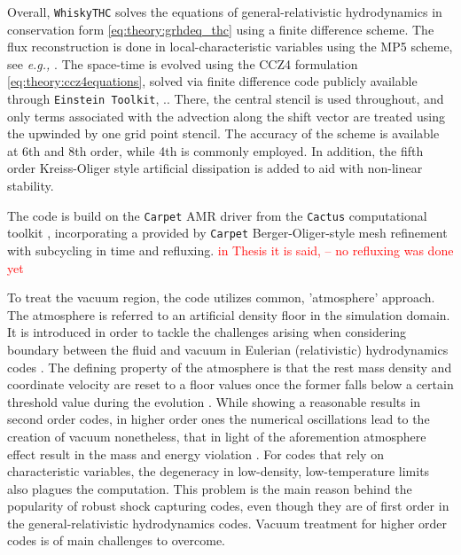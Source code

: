 Overall, \texttt{WhiskyTHC} solves the equations of general-relativistic hydrodynamics in conservation form \ref{eq:theory:grhdeq_thc} using a finite difference scheme. 
The flux reconstruction is done in local-characteristic variables using the MP5 scheme, see \textit{e.g.,} \cite{Rezzolla:2013} .
The space-time is evolved using the CCZ4 formulation \ref{eq:theory:ccz4equations}, solved via finite difference code publicly available through \texttt{Einstein Toolkit}, \cite{McLachlan,Loffler:2011ay}..
There, the central stencil is used throughout, and only terms associated with the advection along the shift vector are treated using the upwinded by one grid point stencil. The accuracy of the scheme is available at 6th and 8th order, while 4th is commonly employed. In addition, the fifth order Kreiss-Oliger style artificial dissipation \cite{Kreiss:1973} is added to aid with non-linear stability.

The code is build on the \texttt{Carpet} AMR driver \cite{Schnetter:2003rb} from the \texttt{Cactus} computational toolkit \cite{Goodale:2003}, incorporating a provided by \texttt{Carpet} Berger-Oliger-style mesh refinement \cite{Berger:1989,Berger:1984} with subcycling in time and refluxing. \textcolor{red}{in Thesis it is said, -- no refluxing was done yet}

To treat the vacuum region, the code utilizes common, 'atmosphere' approach. The atmosphere is referred to an artificial density floor in the simulation domain. It is introduced in order to tackle the challenges arising when considering boundary between the fluid and vacuum in Eulerian (relativistic) hydrodynamics codes \cite{Galeazzi:mThesis:2008,Kastaun:2006,Millmore:2009dk}. 
The defining property of the atmosphere is that the rest mass density and coordinate velocity are reset to a floor values once the former falls below a certain threshold value during the evolution \cite{Font:2001ew,Baiotti:2004wn}. While showing a reasonable results in second order codes, in higher order ones the numerical oscillations lead to the creation of vacuum nonetheless, that in light of the aforemention atmosphere effect result in the mass and energy violation \cite{Radice:2011qr}. For codes that rely on characteristic variables, the degeneracy in low-density, low-temperature limits also plagues the computation. This problem is the main reason behind the popularity of robust shock capturing codes, even though they are of first order in the general-relativistic hydrodynamics codes. Vacuum treatment for higher order codes is of main challenges to overcome.

